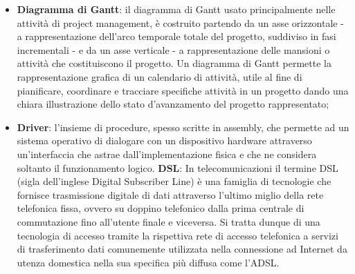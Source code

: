 \begin{itemize}
\begin{itemize}
	\end{itemize}
	\item
	\textbf{Diagramma di Gantt}: il diagramma di Gantt usato principalmente nelle attività di project management, è costruito partendo da un asse orizzontale - a rappresentazione dell'arco temporale totale del progetto, suddiviso in fasi incrementali - e da un asse verticale - a rappresentazione delle mansioni o attività che costituiscono il progetto.
	Un diagramma di Gantt permette la rappresentazione grafica di un calendario di attività, utile al fine di pianificare, coordinare e tracciare specifiche attività in un progetto dando una chiara illustrazione dello stato d'avanzamento del progetto rappresentato;

	
	\item
	\textbf{Driver}: l'insieme di procedure, spesso scritte in assembly, che permette ad un sistema operativo di dialogare con un dispositivo hardware attraverso un'interfaccia che astrae dall'implementazione fisica e che ne considera soltanto il funzionamento logico.
	\textbf{DSL}: In telecomunicazioni il termine DSL (sigla dell'inglese Digital Subscriber Line) è una famiglia di tecnologie che fornisce trasmissione digitale di dati attraverso l'ultimo miglio della rete telefonica fissa, ovvero su doppino telefonico dalla prima centrale di commutazione fino all'utente finale e viceversa.
	Si tratta dunque di una tecnologia di accesso tramite la rispettiva rete di accesso telefonica a servizi di trasferimento dati comunemente utilizzata nella connessione ad Internet da utenza domestica nella sua specifica più diffusa come l'ADSL. 
\end{itemize}
